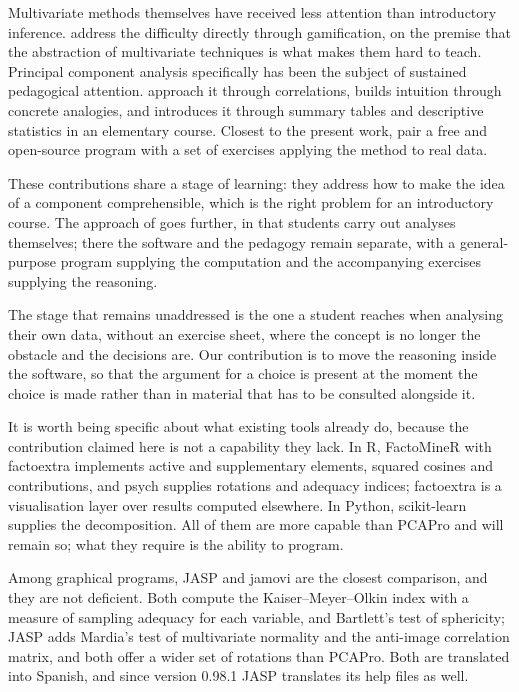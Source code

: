 \documentclass[12pt]{article}
\begin{document}
Multivariate methods themselves have received less attention than introductory
inference. \citet{diiorio2021} address the difficulty directly through
gamification, on the premise that the abstraction of multivariate techniques is
what makes them hard to teach. Principal component analysis specifically has
been the subject of sustained pedagogical attention.
\citet{westfall2017} approach it through correlations,
\citet{saccenti2024} builds intuition through concrete analogies, and
\citet{paolino2024} introduces it through summary tables and descriptive
statistics in an elementary course. Closest to the present work,
\citet{sidou2020} pair a free and open-source program with a set of exercises
applying the method to real data.

These contributions share a stage of learning: they address how to make the idea
of a component comprehensible, which is the right problem for an introductory
course. The approach of \citet{sidou2020} goes further, in that students carry
out analyses themselves; there the software and the pedagogy remain separate,
with a general-purpose program supplying the computation and the accompanying
exercises supplying the reasoning.

The stage that remains unaddressed is the one a student reaches when analysing
their own data, without an exercise sheet, where the concept is no longer the
obstacle and the decisions are. Our contribution is to move the reasoning inside
the software, so that the argument for a choice is present at the moment the
choice is made rather than in material that has to be consulted alongside it.

It is worth being specific about what existing tools already do, because the
contribution claimed here is not a capability they lack. In R, FactoMineR
\citep{le2008} with factoextra \citep{factoextra} implements active and
supplementary elements, squared cosines and contributions, and psych
\citep{psych} supplies rotations and adequacy indices; factoextra is a
visualisation layer over results computed elsewhere. In Python, scikit-learn
\citep{pedregosa2011} supplies the decomposition. All of them are more capable
than PCAPro and will remain so; what they require is the ability to program.

Among graphical programs, JASP \citep{jasp} and jamovi \citep{jamovi} are the
closest comparison, and they are not deficient. Both compute the
Kaiser--Meyer--Olkin index with a measure of sampling adequacy for each
variable, and Bartlett's test of sphericity; JASP adds Mardia's test of
multivariate normality and the anti-image correlation matrix, and both offer a
wider set of rotations than PCAPro. Both are translated into Spanish, and since
version 0.98.1 JASP translates its help files as well.
\end{document}
